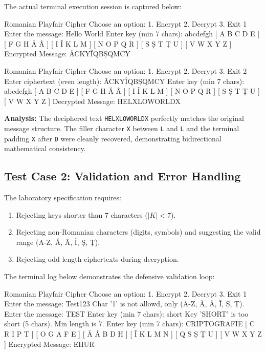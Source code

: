 \documentclass[12pt,a4paper]{article}
\begin{document}
The actual terminal execution session is captured below:

\begin{terminalwindow}
Romanian Playfair Cipher
Choose an option:
1. Encrypt
2. Decrypt
3. Exit
1
Enter the message: 
Hello World
Enter key (min 7 chars): abcdefgh
[      A      B      C      D      E  ]
[      F      G      H      Ă      Â  ]
[      I      Î      K      L      M  ]
[      N      O      P      Q      R  ]
[      S      Ș      T      Ț      U  ]
[      V      W      X      Y      Z  ]
Encrypted Message: ÂCKYÎQBȘQMCY

Romanian Playfair Cipher
Choose an option:
1. Encrypt
2. Decrypt
3. Exit
2
Enter ciphertext (even length): ÂCKYÎQBȘQMCY
Enter key (min 7 chars): abcdefgh
[      A      B      C      D      E  ]
[      F      G      H      Ă      Â  ]
[      I      Î      K      L      M  ]
[      N      O      P      Q      R  ]
[      S      Ș      T      Ț      U  ]
[      V      W      X      Y      Z  ]
Decrypted Message: HELXLOWORLDX
\end{terminalwindow}

\textbf{Analysis:} The deciphered text \texttt{HELXLOWORLDX} perfectly matches the original message structure. The filler character \texttt{X} between \texttt{L} and \texttt{L} and the terminal padding \texttt{X} after \texttt{D} were cleanly recovered, demonstrating bidirectional mathematical consistency.

\subsection{Test Case 2: Validation and Error Handling}
The laboratory specification requires:
\begin{enumerate}
    \item Rejecting keys shorter than $7$ characters ($|K| < 7$).
    \item Rejecting non-Romanian characters (digits, symbols) and suggesting the valid range (A-Z, Ă, Â, Î, Ș, Ț).
    \item Rejecting odd-length ciphertexts during decryption.
\end{enumerate}

The terminal log below demonstrates the defensive validation loop:

\begin{terminalwindow}
Romanian Playfair Cipher
Choose an option:
1. Encrypt
2. Decrypt
3. Exit
1
Enter the message: 
Test123
Char '1' is not allowd, only (A-Z, Ă, Â, Î, Ș, Ț).
Enter the message: 
TEST
Enter key (min 7 chars): short
Key 'SHORT' is too short (5 chars). Min length is 7.
Enter key (min 7 chars): CRIPTOGRAFIE
[      C      R      I      P      T  ]
[      O      G      A      F      E  ]
[      Ă      Â      B      D      H  ]
[      Î      K      L      M      N  ]
[      Q      S      Ș      Ț      U  ]
[      V      W      X      Y      Z  ]
Encrypted Message: EHUR
\end{terminalwindow}
\end{document}
